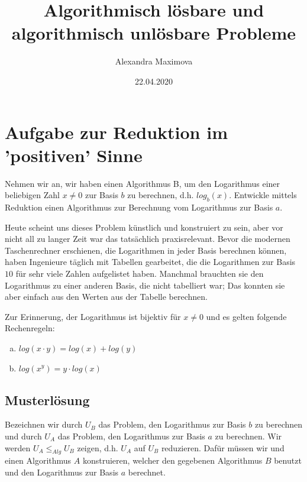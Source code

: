 \documentclass[
	12pt, %
	german, %
]{fphw}
\title{Algorithmisch lösbare und algorithmisch unlösbare Probleme} %
\author{Alexandra Maximova} %
\date{22.04.2020} %
\institute{ETH Zurich \\ Lehrdiplom Informatik} %
\begin{document}
\maketitle %


\section*{Aufgabe zur Reduktion im 'positiven' Sinne}

\begin{problem}
	Nehmen wir an, wir haben einen Algorithmus B, um den Logarithmus einer beliebigen Zahl \(x \neq 0\) zur Basis \(b\) zu berechnen, d.h. \(log_b(x)\). Entwickle mittels Reduktion einen Algorithmus zur Berechnung vom Logarithmus zur Basis \(a\).
	
	Heute scheint uns dieses Problem künstlich und konstruiert zu sein, aber vor nicht all zu langer Zeit war das tatsächlich praxisrelevant. Bevor die modernen Taschenrechner erschienen, die Logarithmen in jeder Basis berechnen können, haben Ingenieure täglich mit Tabellen gearbeitet, die die Logarithmen zur Basis \(10\) für sehr viele Zahlen aufgelistet haben. Manchmal brauchten sie den Logarithmus zu einer anderen Basis, die nicht tabelliert war; Das konnten sie aber einfach aus den Werten aus der Tabelle berechnen.
	
	Zur Erinnerung, der Logarithmus ist bijektiv für \(x \neq 0\) und es gelten folgende Rechenregeln:
	\begin{enumerate}[(a)]
		\item \( log(x \cdot y) = log(x) + log(y) \)
		\item \( log(x^y) = y \cdot log(x) \)
	\end{enumerate}
\end{problem}



\subsection*{Musterlösung}

Bezeichnen wir durch \(U_B\) das Problem, den Logarithmus zur Basis \(b\) zu berechnen und durch \(U_A\) das Problem, den Logarithmus zur Basis \(a\) zu berechnen. Wir werden \(U_A \leq_{Alg} U_B\) zeigen, d.h. \(U_A\) auf \(U_B\) reduzieren. Dafür müssen wir und einen Algorithmus \(A\) konstruieren, welcher den gegebenen Algorithmus \(B\) benutzt und den Logarithmus zur Basis \(a\) berechnet.
\end{document}
